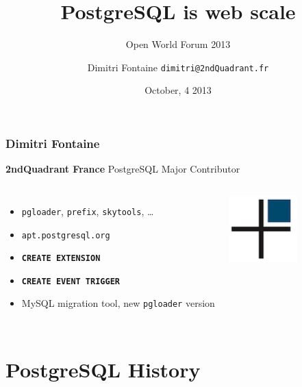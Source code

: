\documentclass{beamer}
\title{PostgreSQL is web scale}
\subtitle{Open World Forum 2013}
\author{Dimitri Fontaine \texttt{dimitri@2ndQuadrant.fr}}
\date{October, 4 2013}
\begin{document}
\frame{\titlepage}

\begin{frame}[fragile]
  \frametitle{Dimitri Fontaine}

  \begin{center}
    \textbf{2ndQuadrant France}
    \linebreak
    PostgreSQL Major Contributor
  \end{center}
  \vfill

\begin{columns}[c]

  \begin{itemize}
   \item \texttt{pgloader}, \texttt{prefix}, \texttt{skytools}, …
   \item \texttt{apt.postgresql.org}
   \item \texttt{\textbf{CREATE EXTENSION}}
   \item \texttt{\textbf{CREATE EVENT TRIGGER}}
   \item MySQL migration tool, new \texttt{pgloader} version
  \end{itemize}  

\begin{center}
  \includegraphics[height=7em]{2ndQuadrant-cross.png}
\end{center}
\end{columns}
\end{frame}

\section{PostgreSQL History}
\end{document}
